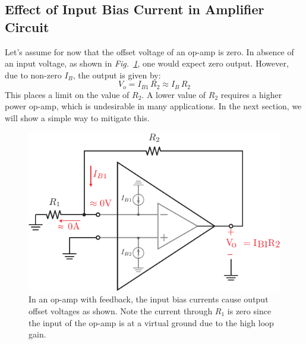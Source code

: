 \subsection{Effect of Input Bias Current in Amplifier Circuit}
Let's assume for now that the offset voltage of an op-amp is zero.  In absence of an input voltage, as shown in \emph{Fig.~\ref{fig:opamp_offset_i2v}}, one would expect zero output.  However, due to non-zero $I_B$, the output is given by:
\begin{equation}
      V_o = I_{B1}\,R_2 \approx I_B\,R_2 
      \label{eq:off1}
\end{equation}
This places a limit on the value of $R_2$. A lower value of $R_2$ requires a higher power op-amp, which is undesirable in many applications.  In the next section, we will show a simple way to mitigate this.
\begin{figure}[H]
\centering
\includegraphics[scale=1.25]{opamp_offset_i2v}
\caption{In an op-amp with feedback, the input bias currents cause output offset voltages as shown.  Note the current through $R_1$ is zero since the input of the op-amp is at a virtual ground due to the high loop gain.}
\label{fig:opamp_offset_i2v}
\end{figure}
\newpage
